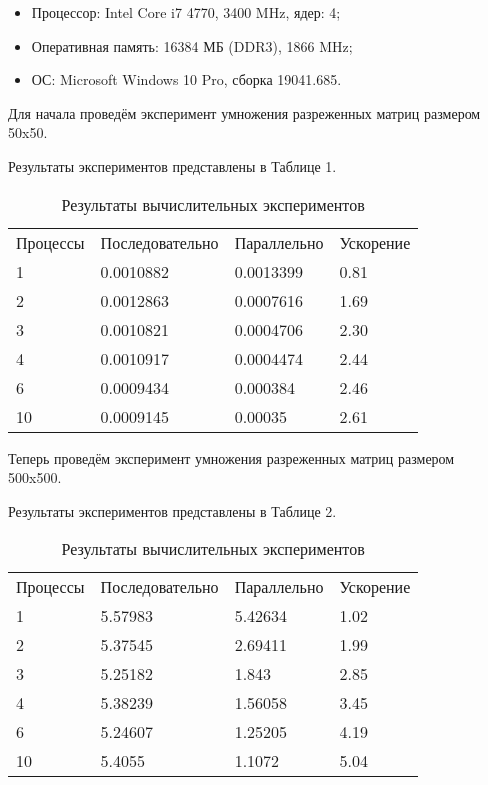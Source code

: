 \documentclass{report}
\begin{document}
\begin{itemize}
\item Процессор: Intel Core i7 4770, 3400 MHz, ядер: 4;
\item Оперативная память: 16384 МБ (DDR3), 1866 MHz;
\item ОС: Microsoft Windows 10 Pro, сборка 19041.685.
\end{itemize}

\par Для начала проведём эксперимент умножения разреженных матриц размером 50x50. 
\par Результаты экспериментов представлены в Таблице 1.

\begin{table}[!h]
\caption{Результаты вычислительных экспериментов}
\centering
\begin{tabular}{p{3cm} p{4cm} p{4cm} p{4cm}}
Процессы & Последовательно & Параллельно & Ускорение  \\
1        & 0.0010882          & 0.0013399     & 0.81       \\
2        & 0.0012863         & 0.0007616     & 1.69       \\
3        & 0.0010821         & 0.0004706     & 2.30       \\
4        & 0.0010917         & 0.0004474     & 2.44       \\
6        & 0.0009434         & 0.000384     & 2.46       \\
10        & 0.0009145        & 0.00035     & 2.61
\end{tabular}
\end{table}

\par Теперь проведём эксперимент умножения разреженных матриц размером 500x500.
\par Результаты экспериментов представлены в Таблице 2.

\begin{table}[!h]
\caption{Результаты вычислительных экспериментов}
\centering
\begin{tabular}{p{3cm} p{4cm} p{4cm} p{4cm}}
Процессы & Последовательно & Параллельно & Ускорение  \\
1        & 5.57983          & 5.42634     & 1.02       \\
2        & 5.37545         & 2.69411     & 1.99       \\
3        & 5.25182         & 1.843     & 2.85       \\
4        & 5.38239         & 1.56058     & 3.45       \\
6        & 5.24607         & 1.25205     & 4.19       \\
10        & 5.4055         & 1.1072     & 5.04
\end{tabular}
\end{table}
\newpage
\end{document}
